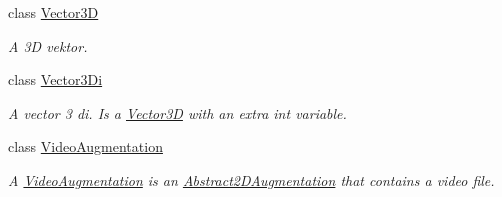\begin{DoxyCompactItemize}
class \hyperlink{class_a_rdev_kit_1_1_model_1_1_project_1_1_vector3_d}{Vector3\-D}
\begin{DoxyCompactList}\small\item\em A 3\-D vektor. \end{DoxyCompactList}\item 
class \hyperlink{class_a_rdev_kit_1_1_model_1_1_project_1_1_vector3_di}{Vector3\-Di}
\begin{DoxyCompactList}\small\item\em A vector 3 di. Is a \hyperlink{class_a_rdev_kit_1_1_model_1_1_project_1_1_vector3_d}{Vector3\-D} with an extra int variable. \end{DoxyCompactList}\item 
class \hyperlink{class_a_rdev_kit_1_1_model_1_1_project_1_1_video_augmentation}{Video\-Augmentation}
\begin{DoxyCompactList}\small\item\em A \hyperlink{class_a_rdev_kit_1_1_model_1_1_project_1_1_video_augmentation}{Video\-Augmentation} is an \hyperlink{class_a_rdev_kit_1_1_model_1_1_project_1_1_abstract2_d_augmentation}{Abstract2\-D\-Augmentation} that contains a video file. \end{DoxyCompactList}\end{DoxyCompactItemize}
